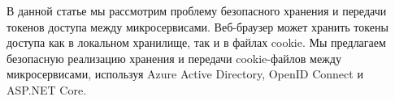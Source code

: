 В данной статье мы рассмотрим проблему безопасного хранения и передачи токенов доступа между микросервисами.
Веб-браузер может хранить токены доступа как в локальном хранилище, так и в файлах cookie.
Мы предлагаем безопасную реализацию хранения и передачи cookie-файлов между микросервисами, используя
Azure Active Directory, OpenID Connect и ASP.NET Core.